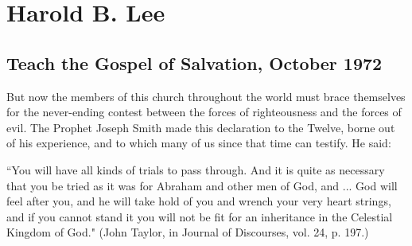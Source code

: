 \section{Harold B. Lee}

\subsection{Teach the Gospel of Salvation, October 1972}

But now the members of this church throughout the world must brace themselves for the never-ending contest between the forces of righteousness and the forces of evil. The Prophet Joseph Smith made this declaration to the Twelve, borne out of his experience, and to which many of us since that time can testify. He said:

``You will have all kinds of trials to pass through. And it is quite as necessary that you be tried as it was for Abraham and other men of God, and ... God will feel after you, and he will take hold of you and wrench your very heart strings, and if you cannot stand it you will not be fit for an inheritance in the Celestial Kingdom of God." (John Taylor, in Journal of Discourses, vol. 24, p. 197.)